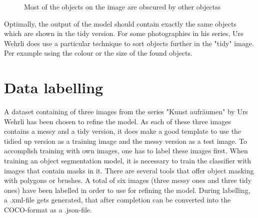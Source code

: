  \begin{figure}[H]
	\caption{\label{fig:ka-fruechte-messy} Most of the objects on the image are obscured by other objectss}
\end{figure}

Optimally, the output of the model should contain exactly the same objects which are shown in the tidy version. For some photographies in his series, Urs Wehrli does use a particular technique to sort objects further in the "tidy" image. Per example using the colour or the size of the found objects.

\section{Data labelling}

A dataset containing of three images from the series "Kunst aufräumen" by Urs Wehrli has been chosen to refine the model. As each of these three images contains a messy and a tidy version, it does make a good template to use the tidied up version as a training image and the messy version as a test image. To accomplish training with own images, one has to label these images first. When training an object segmentation model, it is necessary to train the classifier with images that contain masks in it. There are several tools that offer object masking with polygons or brushes. A total of six images (three messy ones and three tidy ones) have been labelled in order to use for refining the model. During labelling, a .xml-file gets generated, that after completion can be converted into the COCO-format as a .json-file.

